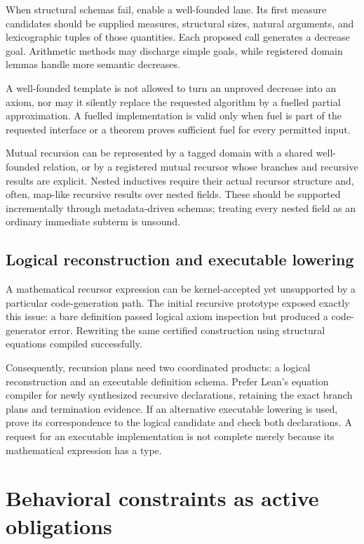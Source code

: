 \documentclass[11pt,letterpaper]{article}
\newcommand{\code}[1]{\texttt{\detokenize{#1}}}
\theoremstyle{definition}
\theoremstyle{remark}
\begin{document}
When structural schemas fail, enable a well-founded lane. Its first measure candidates should be supplied measures, structural sizes, natural arguments, and lexicographic tuples of those quantities. Each proposed call generates a decrease goal. Arithmetic methods may discharge simple goals, while registered domain lemmas handle more semantic decreases.

A well-founded template is not allowed to turn an unproved decrease into an axiom, nor may it silently replace the requested algorithm by a fuelled partial approximation. A fuelled implementation is valid only when fuel is part of the requested interface or a theorem proves sufficient fuel for every permitted input.

Mutual recursion can be represented by a tagged domain with a shared well-founded relation, or by a registered mutual recursor whose branches and recursive results are explicit. Nested inductives require their actual recursor structure and, often, map-like recursive results over nested fields. These should be supported incrementally through metadata-driven schemas; treating every nested field as an ordinary immediate subterm is unsound.

\subsection{Logical reconstruction and executable lowering}

A mathematical recursor expression can be kernel-accepted yet unsupported by a particular code-generation path. The initial recursive prototype exposed exactly this issue: a bare \code{List.rec} definition passed logical axiom inspection but produced a code-generator error. Rewriting the same certified construction using structural equations compiled successfully.

Consequently, recursion plans need two coordinated products: a logical reconstruction and an executable definition schema. Prefer Lean's equation compiler for newly synthesized recursive declarations, retaining the exact branch plans and termination evidence. If an alternative executable lowering is used, prove its correspondence to the logical candidate and check both declarations. A request for an executable implementation is not complete merely because its mathematical expression has a type.

\section{Behavioral constraints as active obligations}
\label{sec:contracts}
\end{document}
